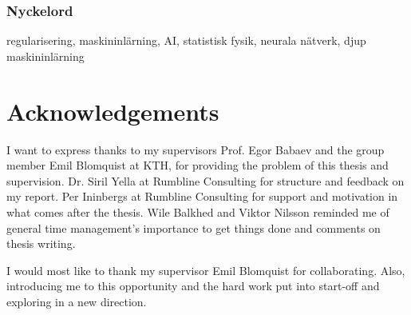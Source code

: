 \subsection*{Nyckelord}
regularisering, maskininlärning, AI, statistisk fysik, neurala nätverk, djup maskininlärning


\newpage
\thispagestyle{plain}
\chapter*{Acknowledgements}
I want to express thanks to my supervisors Prof. Egor Babaev and the group member Emil Blomquist at KTH, for providing the problem of this thesis and supervision. Dr. Siril Yella at Rumbline Consulting for structure and feedback on my report. Per Ininbergs at Rumbline Consulting for support and motivation in what comes after the thesis. Wile Balkhed and Viktor Nilsson reminded me of general time management's importance to get things done and comments on thesis writing. 

I would most like to thank my supervisor Emil Blomquist for collaborating. Also, introducing me to this opportunity and the hard work put into start-off and exploring in a new direction.

\newpage

\thispagestyle{plain}

\tableofcontents

\newpage
{}

